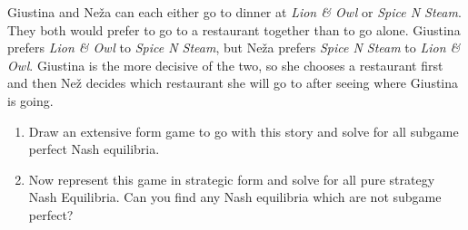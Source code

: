 \documentclass{article}
\begin{document}
\begin{question} 

Giustina and Ne\v{z}a can each either go to dinner at 
  \textit{Lion \& Owl} or \textit{Spice N Steam}.
They both would prefer to go to a restaurant together than to go alone.
Giustina prefers \textit{Lion \& Owl} to \textit{Spice N Steam}, 
  but Ne\v{z}a prefers \textit{Spice N Steam} to \textit{Lion \& Owl}.
Giustina is the more decisive of the two, 
so she chooses a restaurant first
and then Ne\v{z} decides which restaurant she will go to 
after seeing where Giustina is going.

\begin{enumerate}

  \item Draw an extensive form game to go with this story 
  and solve for all subgame perfect Nash equilibria. 

  \vspace{7cm}

  \item 
  Now represent this game in strategic form
  and solve for all pure strategy Nash Equilibria.
  Can you find any Nash equilibria which are not subgame perfect?

  
\end{enumerate}

\end{question}


  
  



\end{document}
